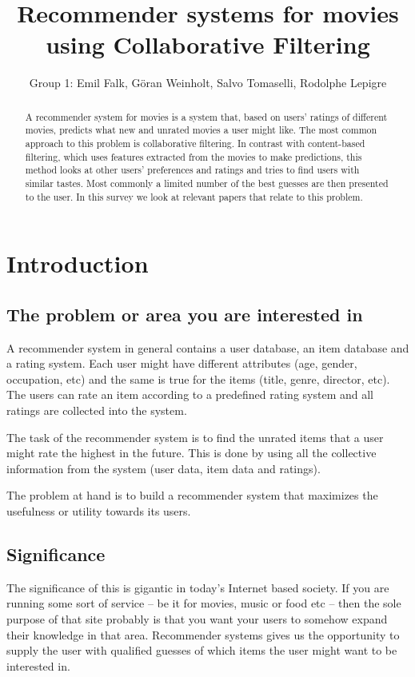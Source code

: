 \documentclass[a4paper,11pt]{article}
\begin{document}
\title{Recommender systems for movies using Collaborative Filtering}
\author{Group 1: Emil Falk, G\"oran Weinholt, Salvo Tomaselli, Rodolphe Lepigre}

\maketitle
\begin{abstract}\centering
A recommender system for movies is a system that, based on users'
ratings of different movies, predicts what new and unrated
movies a user might like. The most common approach to this problem is
collaborative filtering. In contrast with content-based filtering, which
uses features extracted from the movies to make predictions, this method
looks at other users' preferences and ratings and tries to find users with
similar tastes. Most commonly a limited number of the best guesses
are then presented to the user. In this survey we look at relevant papers
that relate to this problem.
\end{abstract}

\section{Introduction}
\subsection{The problem or area you are interested in}
A recommender system in general contains a user database,
an item database and a rating system. Each user might have different attributes
(age, gender, occupation, etc) and the same is true for the items (title, genre, director, etc).
The users can rate an item according to a predefined rating system and all
ratings are collected into the system.

The task of the recommender system is to find the unrated items that a user
might rate the highest in the future. This is done by using all the collective
information from the system (user data, item data and ratings).

The problem at hand is to build a recommender system that maximizes the usefulness
or utility towards its users.
\subsection{Significance}
The significance of this is gigantic in today's Internet based society. If you are running some sort
of service -- be it for movies, music or food etc -- then the sole purpose of that site probably is that
you want your users to somehow expand their knowledge in that area. Recommender systems gives us the
opportunity to supply the user with qualified guesses of which items the user might want to be
interested in.
\end{document}

